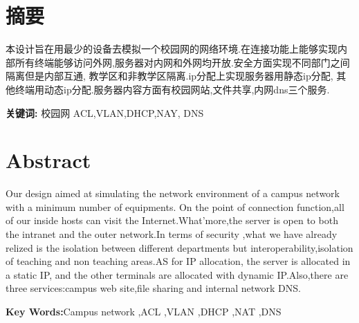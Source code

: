 \section*{ \centering 摘要}

\vskip0.5cm
本设计旨在用最少的设备去模拟一个校园网的网络环境.在连接功能上能够实现内部所有终端能够访问外网,服务器对内网和外网均开放.安全方面实现不同部门之间隔离但是内部互通, 教学区和非教学区隔离.ip分配上实现服务器用静态ip分配, 其他终端用动态ip分配.服务器内容方面有校园网站,文件共享,内网dns三个服务.

\textbf{关键词:}  校园网 ACL,VLAN,DHCP,NAY, DNS

\clearpage
\section*{ \centering \textbf{Abstract} }
Our design aimed at simulating the network environment of a campus network with a minimum number of equipments.
On the point of connection function,all of our inside hosts can visit the Internet.What'more,the server is open to
both the intranet and the outer network.In terms of security ,what we have already relized is the isolation between
different departments but interoperability,isolation of teaching and non teaching areas.AS  for IP allocation,
the server is allocated in a static IP, and the other terminals are allocated with dynamic IP.Also,there are three services:campus web site,file sharing and internal network DNS.  

\textbf{Key Words:}Campus network ,ACL ,VLAN ,DHCP ,NAT ,DNS 




